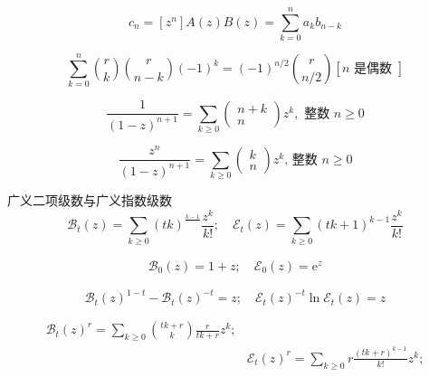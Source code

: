 \begin{equation}
    c_{n}= [z^{n}]A(z)B(z) = \sum_{k=0}^{n} a_{k} b_{n-k}
\end{equation}

\begin{equation}
    \sum_{k=0}^{n}{r \choose k}{r \choose n-k}(-1)^{k}=(-1)^{n / 2}{r \choose n / 2}[n \text { 是偶数 }]
\end{equation}

\begin{equation}
    \frac{1}{(1-z)^{n+1}}=\sum_{k \geqslant 0}\left(\begin{array}{c}
    n+k \\
    n
    \end{array}\right) z^{k}, \text { 整数 } n \geqslant 0
\end{equation}

\begin{equation}
    \frac{z^{n}}{(1-z)^{n+1}}=\sum_{k \geqslant 0}\left(\begin{array}{l}
    k \\
    n
    \end{array}\right) z^{k} \text {, 整数 } n \geqslant 0
\end{equation}

广义二项级数与广义指数级数
\begin{equation}
    \mathcal{B}_{t}(z)=\sum_{k \geqslant 0}(t k)^{\frac{k-1}{}} \frac{z^{k}}{k !} ; \quad \mathcal{E}_{t}(z)=\sum_{k \geqslant 0}(t k+1)^{k-1} \frac{z^{k}}{k !}
\end{equation}

\begin{align*}
    \mathcal{B}_{0}(z)=1+z ; \quad \mathcal{E}_{0}(z)=\mathrm{e}^{z}
\end{align*}

\begin{equation}
    \mathcal{B}_{t}(z)^{1-t}-\mathcal{B}_{t}(z)^{-t}=z ; \quad \mathcal{E}_{t}(z)^{-t} \ln \mathcal{E}_{t}(z)=z
\end{equation}

\begin{equation}
    \begin{aligned}
    \mathcal{B}_{t}(z)^{r}=\sum_{k \geqslant 0}{t k+r \choose k} \frac{r}{t k+r} z^{k} ; \\
    & \mathcal{E}_{t}(z)^{r}=\sum_{k \geqslant 0} r \frac{(t k+r)^{k-1}}{k !} z^{k} ;
    \end{aligned}
\end{equation}

